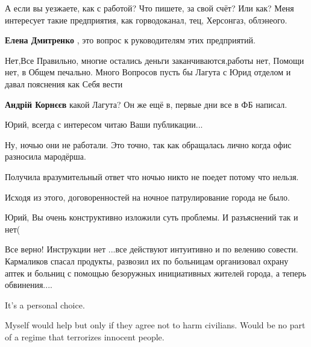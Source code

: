 \begin{itemize}

А если вы уезжаете, как с работой? Что пишете, за свой счёт? Или как? Меня
интересует такие предприятия, как горводоканал, тец, Херсонгаз, облэнеого.

\textbf{Елена Дмитренко} , это вопрос к руководителям этих предприятий.


Нет,Все Правильно, многие остались деньги заканчиваются,работы нет, Помощи нет,
в Общем печально. Много Вопросов пусть бы Лагута с Юрид отделом и давал
пояснения как Себя вести

\textbf{Андрій Корнєєв} какой Лагута? Он же ещё в, первые дни все в ФБ написал.

Юрий, всегда с интересом читаю Ваши публикации...


Ну, ночью они не работали. Это точно, так как обращалась лично когда офис
разносила мародёрша.

Получила вразумительный ответ что ночью никто не поедет потому что нельзя.

Исходя из этого, договоренностей на ночное патрулирование города не было.


Юрий, Вы очень конструктивно изложили суть проблемы. И разъяснений так и нет(


Все верно! Инструкции нет ...все действуют интуитивно и по велению совести.
Кармаликов спасал продукты, развозил их по больницам организовал охрану аптек и
больниц с помощью безоружных инициативных жителей города, а теперь обвинения....


It's a personal choice.

Myself would help but only if they agree not to harm civilians. Would be no
part of a regime that terrorizes innocent people.


\end{itemize} %

